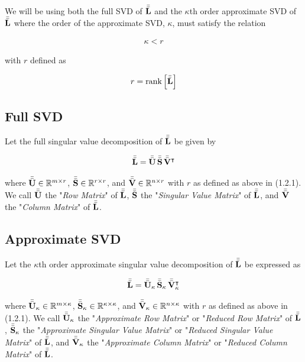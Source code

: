 \documentclass[../ClusteringConnectionsMAIN.tex]{subfiles}
\begin{document}
\begin{flushleft}
\begin{large}

We will be using both the full SVD of $\bar{\bar{\mathbf{L}}}$ and the $\kappa$th order approximate SVD of $\bar{\bar{\mathbf{L}}}$ where the order of the approximate SVD, $\kappa$, must satisfy the relation

\begin{align*}
\kappa < r
\end{align*}

with $r$ defined as

\begin{align}
r = \text{rank} \left[ \bar{\bar{\mathbf{L}}} \right]
\end{align}


\subsection{Full SVD}

Let the full singular value decomposition of $\bar{\bar{\mathbf{L}}}$ be given by

\begin{align*}
\bar{\bar{\mathbf{L}}} = \bar{\bar{\mathbf{U}}} \, \bar{\bar{\mathbf{S}}} \, \bar{\bar{\mathbf{V}}}^\intercal
\end{align*}

where $\bar{\bar{\mathbf{U}}} \in \mathbb{R}^{m \times r}$, $\bar{\bar{\mathbf{S}}} \in \mathbb{R}^{r \times r}$, and $\bar{\bar{\mathbf{V}}} \in \mathbb{R}^{n \times r}$ with $r$ as defined as above in (1.2.1).  We call $\bar{\bar{\mathbf{U}}}$ the "\emph{Row Matrix}" of $\bar{\bar{\mathbf{L}}}$, $\bar{\bar{\mathbf{S}}}$ the "\emph{Singular Value Matrix}" of $\bar{\bar{\mathbf{L}}}$, and $\bar{\bar{\mathbf{V}}}$ the "\emph{Column Matrix}" of $\bar{\bar{\mathbf{L}}}$.


\subsection{Approximate SVD}

Let the $\kappa$th order approximate singular value decomposition of $\bar{\bar{\mathbf{L}}}$ be expressed as

\begin{align*}
\bar{\bar{\mathbf{L}}} = \bar{\bar{\mathbf{U}}}_\kappa \, \bar{\bar{\mathbf{S}}}_\kappa \, \bar{\bar{\mathbf{V}}}_\kappa^\intercal
\end{align*}

where $\bar{\bar{\mathbf{U}}}_\kappa \in \mathbb{R}^{m \times \kappa}$, $\bar{\bar{\mathbf{S}}}_\kappa \in \mathbb{R}^{\kappa \times \kappa}$, and $\bar{\bar{\mathbf{V}}}_\kappa \in \mathbb{R}^{n \times \kappa}$ with $r$ as defined as above in (1.2.1).  We call $\bar{\bar{\mathbf{U}}}_\kappa$ the "\emph{Approximate Row Matrix}" or "\emph{Reduced Row Matrix}" of $\bar{\bar{\mathbf{L}}}$, $\bar{\bar{\mathbf{S}}}_\kappa$ the "\emph{Approximate Singular Value Matrix}" or "\emph{Reduced Singular Value Matrix}" of $\bar{\bar{\mathbf{L}}}$, and $\bar{\bar{\mathbf{V}}}_\kappa$ the "\emph{Approximate Column Matrix}" or "\emph{Reduced Column Matrix}" of $\bar{\bar{\mathbf{L}}}$.


\end{large}
\end{flushleft}
\end{document}
